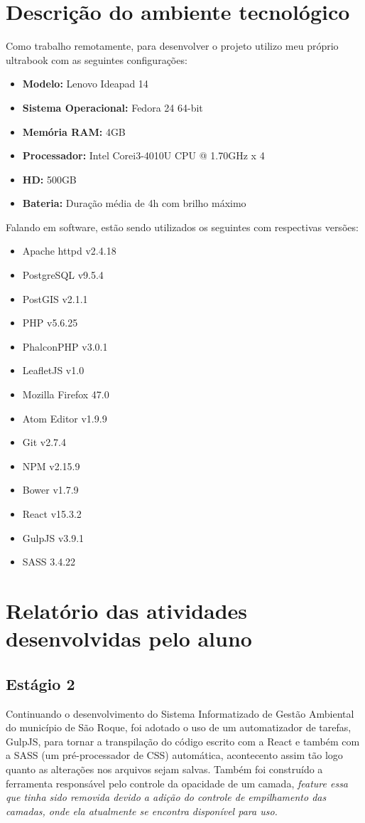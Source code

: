 \documentclass{ufscar}
\begin{document}
\section{Descrição do ambiente tecnológico}
Como trabalho remotamente, para desenvolver o projeto utilizo meu próprio ultrabook com as seguintes configurações:
\begin{itemize}
  \item \textbf{Modelo:} Lenovo Ideapad 14
  \item \textbf{Sistema Operacional:} Fedora 24 64-bit
  \item \textbf{Memória RAM:} 4GB
  \item \textbf{Processador:} Intel\textsuperscript{\textregistered} Core\texttrademark  i3-4010U CPU @ 1.70GHz x 4
  \item \textbf{HD:} 500GB
  \item \textbf{Bateria:} Duração média de 4h com brilho máximo
\end{itemize}
Falando em software, estão sendo utilizados os seguintes com respectivas versões:
\begin{itemize}
  \item Apache httpd v2.4.18
  \item PostgreSQL v9.5.4
  \item PostGIS v2.1.1
  \item PHP v5.6.25
  \item PhalconPHP v3.0.1
  \item LeafletJS v1.0
  \item Mozilla Firefox 47.0
  \item Atom Editor v1.9.9
  \item Git v2.7.4
  \item NPM v2.15.9
  \item Bower v1.7.9
  \item React v15.3.2
  \item GulpJS v3.9.1
  \item SASS 3.4.22
\end{itemize}

\section{Relatório das atividades desenvolvidas pelo aluno}
\subsection{Estágio 2}
Continuando o desenvolvimento do Sistema Informatizado de Gestão Ambiental do município de São Roque, foi adotado o uso de um automatizador de tarefas, GulpJS, para tornar a transpilação do código escrito com a React e também com a SASS (um pré-processador de CSS) automática, acontecento assim tão logo quanto as alterações nos arquivos sejam salvas. Também foi construído a ferramenta responsável pelo controle da opacidade de um camada, \it{feature} essa que tinha sido removida devido a adição do controle de empilhamento das camadas, onde ela atualmente se encontra disponível para uso.
\end{document}
